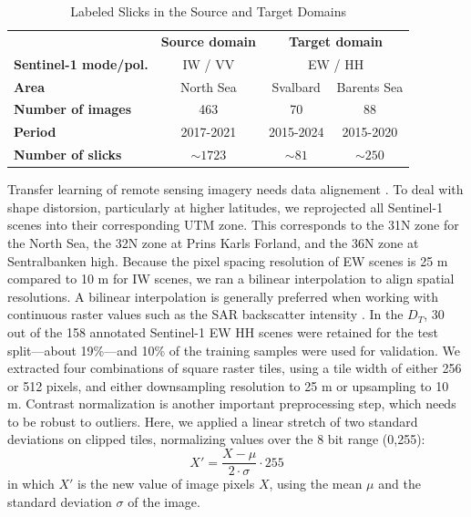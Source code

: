 \documentclass[lettersize,journal]{IEEEtran}
\begin{document}
\begin{table}[!t]
    \caption{Labeled Slicks in the Source and Target Domains}
    \label{table1}
    \centering
    \begin{tabular}{lcc|cc}
        \toprule
        & \multicolumn{2}{c}{\textbf{Source domain}} & \multicolumn{2}{c}{\textbf{Target domain}} \\
        \cmidrule(lr){2-3} \cmidrule(lr){4-5}
        \textbf{Sentinel-1 mode/pol.} & \multicolumn{2}{c}{IW / VV} & \multicolumn{2}{c}{EW / HH} \\
        \midrule
        \textbf{Area} & \multicolumn{2}{c}{North Sea} & Svalbard & Barents Sea \\
        \textbf{Number of images} & \multicolumn{2}{c}{463} & 70 & 88 \\
        \textbf{Period} & \multicolumn{2}{c}{2017-2021} & 2015-2024 & 2015-2020 \\
        \textbf{Number of slicks} & \multicolumn{2}{c}{$\sim 1723$} & $\sim 81$ & $\sim 250$ \\
        \bottomrule
    \end{tabular}
\end{table}

Transfer learning of remote sensing imagery needs data alignement \cite{tuiaDomainAdaptationClassification2016}. To deal with shape distorsion, particularly at higher latitudes, we reprojected 
all Sentinel-1 scenes into their corresponding UTM zone. This corresponds to the 31N zone for the North Sea, the 32N zone at Prins Karls Forland, and the 36N zone at Sentralbanken high. 
Because the pixel spacing resolution of EW scenes is 25 m compared to 10 m for IW scenes, we ran a bilinear interpolation to align spatial resolutions. A bilinear interpolation is 
generally preferred when working with continuous raster values such as the SAR backscatter intensity \cite{schowengerdtRemoteSensingModels2006}. In the $\mathit{D}_T$, 30 out of the 158 annotated Sentinel-1 EW HH scenes were retained for the test 
split—about 19\%—and 10\% of the training samples were used for validation. We extracted four combinations of square raster tiles, using a tile width of either 256 or 512 pixels, and either downsampling 
resolution to 25 m or upsampling to 10 m. Contrast normalization is another important preprocessing step, which needs to be robust to outliers\cite{goodfellowDeepLearning2016,schowengerdtRemoteSensingModels2006}. 
Here, we applied a linear stretch of two standard deviations on clipped tiles, normalizing values over the 8 bit range (0,255):
\begin{equation}
    X' = \frac{X - \mu }{2 \cdot \sigma} \cdot 255
\end{equation}
in which \( X' \) is the new value of image pixels \( X \), using the mean \( \mu \) and the standard deviation \( \sigma \) of the image.
\end{document}
